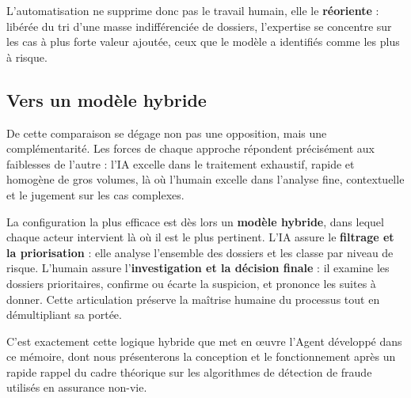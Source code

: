 L'automatisation ne supprime donc pas le travail humain, elle le \textbf{réoriente} : libérée du tri d'une masse indifférenciée de dossiers, l'expertise se concentre sur les cas à plus forte valeur ajoutée, ceux que le modèle a identifiés comme les plus à risque.

\subsection{Vers un modèle hybride}

De cette comparaison se dégage non pas une opposition, mais une complémentarité. Les forces de chaque approche répondent précisément aux faiblesses de l'autre : l'IA excelle dans le traitement exhaustif, rapide et homogène de gros volumes, là où l'humain excelle dans l'analyse fine, contextuelle et le jugement sur les cas complexes.

La configuration la plus efficace est dès lors un \textbf{modèle hybride}, dans lequel chaque acteur intervient là où il est le plus pertinent. L'IA assure le \textbf{filtrage et la priorisation} : elle analyse l'ensemble des dossiers et les classe par niveau de risque. L'humain assure l'\textbf{investigation et la décision finale} : il examine les dossiers prioritaires, confirme ou écarte la suspicion, et prononce les suites à donner. Cette articulation préserve la maîtrise humaine du processus tout en démultipliant sa portée.

C'est exactement cette logique hybride que met en œuvre l'Agent développé dans ce mémoire, dont nous présenterons la conception et le fonctionnement après un rapide rappel du cadre théorique sur les algorithmes de détection de fraude utilisés en assurance non-vie.
